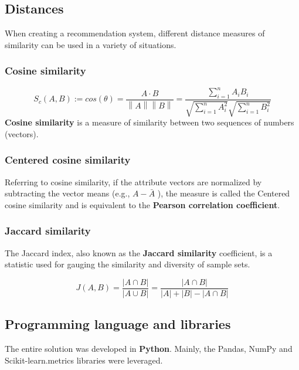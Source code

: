 \subsection{Distances}
\label{sec:distances}

When creating a recommendation system, different distance measures of similarity can be used in a variety of situations. 

\subsubsection{Cosine similarity}

$$
S_c(A, B):= cos(\theta) = \frac{A\cdot B}{\left \| A \right \|\left \| B \right \|} =\frac{\sum_{i=1}^{n}A_iB_i}{\sqrt{\sum_{i=1}^{n}A_i^{2}}\sqrt{\sum_{i=1}^{n}B_i^{2}}}
$$
\textbf{Cosine similarity} is a measure of similarity between two sequences of numbers (vectors).

\subsubsection{Centered cosine similarity}
Referring to cosine similarity, if the attribute vectors are normalized by subtracting the vector means (e.g., $A - \bar{A}$ ), the measure is called the Centered cosine similarity and is equivalent to the \textbf{Pearson correlation coefficient}.

\subsubsection{Jaccard similarity}

The Jaccard index, also known as the \textbf{Jaccard similarity} coefficient, is a statistic used for gauging the similarity and diversity of sample sets. \cite{Jaccard}

$$
J(A,B) = \frac{\left |A \cap B  \right |}{\left |  A \cup B\right |} = \frac{\left | A \cap B   \right | }{\left | A \right | + \left | B  \right | -\left | A \cap B \right |}
$$


\subsection{Programming language and libraries}
The entire solution was developed in \textbf{Python}. Mainly, the Pandas, NumPy and Scikit-learn.metrics libraries were leveraged.







